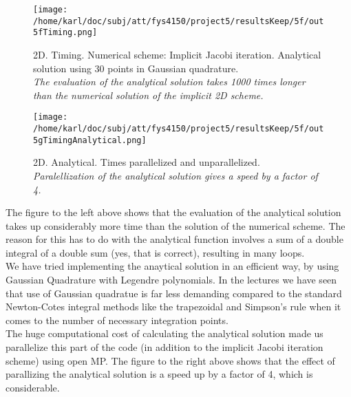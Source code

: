 \documentclass{article}
\begin{document}
\begin{minipage}{.45\textwidth} 
	\begin{figure}[H]
		\centering
		\texttt{[image: /home/karl/doc/subj/att/fys4150/project5/resultsKeep/5f/out5fTiming.png]}
		\caption{2D. Timing. Numerical scheme: Implicit Jacobi iteration. Analytical solution using 30 points in Gaussian quadrature. \\ \textit{The evaluation of the analytical solution takes 1000 times longer than the numerical solution of the implicit 2D scheme.}}
		\label{fig:figParallel1}
	\end{figure}
\end{minipage}\hfill
\begin{minipage}{.45\textwidth} 
	\begin{figure}[H]
		\centering
		\texttt{[image: /home/karl/doc/subj/att/fys4150/project5/resultsKeep/5f/out5gTimingAnalytical.png]}
		\caption{2D. Analytical. Times parallelized and unparallelized.\\ \textit{Paralellization of the analytical solution gives a speed by a factor of 4.}}
		\label{fig:figParalell2}
	\end{figure}
\end{minipage}\hfill
\vspace{2ex}

The figure to the left above shows that the evaluation of the analytical solution takes up considerably more time than the solution of the numerical scheme. The reason for this has to do with the analytical function involves a sum of a double integral of a double sum (yes, that is correct), resulting in many loops.\\

We have tried implementing the anaytical solution in an efficient way, by using Gaussian Quadrature with Legendre polynomials. In the lectures we have seen that use of Gaussian quadratue is far less demanding compared to the standard Newton-Cotes integral methods like the trapezoidal and Simpson's rule when it comes to the number of necessary integration points. \\

The huge computational cost of calculating the analytical solution made us parallelize this part of the code (in addition to the implicit Jacobi iteration scheme) using open MP. The figure to the right above shows that the effect of parallizing the analytical solution is a speed up by a factor of 4, which is considerable.
\end{document}
